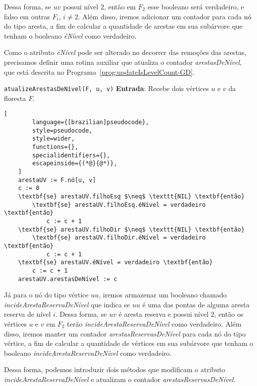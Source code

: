 Dessa forma, se $uv$ possui nível $2$, então em $F_2$ esse booleano será verdadeiro, e falso em outras $F_i$, $i \neq 2$. Além disso, iremos adicionar um contador  para cada nó do tipo aresta, a fim de calcular a quantidade de arestas em sua subárvore que tenham o booleano \textit{éNível} como verdadeiro. 

Como o atributo \textit{éNível} pode ser alterado no decorrer das remoções das arestas, precisamos definir uma rotina auxiliar que atualiza o contador \textit{arestasDeNível}, que está descrita no Programa~\ref{prog:updateIsLevelCount-GD}.

\begin{programruledcaption}{\texttt{atualizeArestasDeNível(F, u, v)} \label{prog:updateIsLevelCount-GD}}
    \noindent\textbf{Entrada}: Recebe dois vértices $u$ e $v$ da floresta $F$.
    \vspace{-0.5\baselineskip}
    \begin{lstlisting}[
        language={[brazilian]pseudocode},
        style=pseudocode,
        style=wider,
        functions={},
        specialidentifiers={},
        escapeinside={(*@}{@*)},
    ]
    arestaUV := F.nó[u, v]
    c := 0
    \textbf{se} arestaUV.filhoEsq $\neq$ \texttt{NIL} \textbf{então}
        \textbf{se} arestaUV.filhoEsq.éNível = verdadeiro \textbf{então}
            c := c + 1
    \textbf{se} arestaUV.filhoDir $\neq$ \texttt{NIL} \textbf{então}
        \textbf{se} arestaUV.filhoDir.éNível = verdadeiro \textbf{então}
            c := c + 1
    \textbf{se} arestaUV.éNível = verdadeiro \textbf{então}
        c := c + 1
    arestaUV.arestasDeNível := c
    \end{lstlisting}
    \vspace{-0.5\baselineskip}
\end{programruledcaption}


Já para o nó do tipo vértice $uu$, iremos armazenar um booleano chamado \textit{incideArestaReservaDeNível} que indica se $uu$ é uma das pontas de alguma aresta reserva de nível $i$. Dessa forma, se $uv$ é aresta reserva e possui nível $2$, então os vértices $u$ e $v$ em $F_2$ terão \textit{incideArestaReservaDeNível} como verdadeiro. Além disso, iremos manter um contador \textit{arestasReservasDeNível} para cada nó do tipo vértice, a fim de calcular a quantidade de vértices em sua subárvore que tenham o booleano \textit{incideArestaReservaDeNível} como verdadeiro. 

Dessa forma, podemos introduzir dois métodos que modificam o atributo \textit{incideArestaReservaDeNível} e atualizam o contador \textit{arestasReservasDeNível}.

